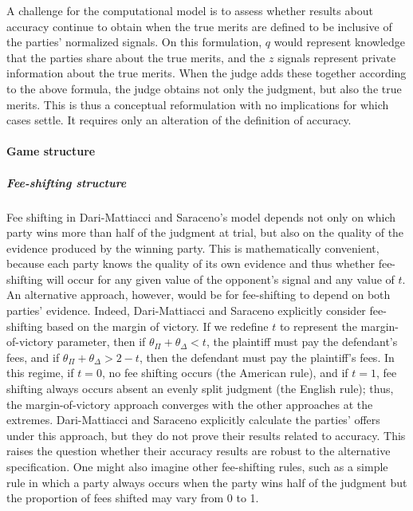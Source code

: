 \documentclass{article}
\begin{document}
A challenge for the computational model is to assess whether results about accuracy continue to obtain when the true merits are defined to be inclusive of the parties' normalized signals. On this formulation, $q$ would represent knowledge that the parties share about the true merits, and the $z$ signals represent private information about the true merits. When the judge adds these together according to the above formula, the judge obtains not only the judgment, but also the true merits. This is thus a conceptual reformulation with no implications for which cases settle. It requires only an alteration of the definition of accuracy.

\paragraph{Game structure}

\subparagraph{Fee-shifting structure}Fee shifting in Dari-Mattiacci and Saraceno's model depends not only on which party wins more than half of the judgment at trial, but also on the quality of the evidence produced by the winning party. This is mathematically convenient, because each party knows the quality of its own evidence and thus whether fee-shifting will occur for any given value of the opponent's signal and any value of $t$. An alternative approach, however, would be for fee-shifting to depend on both parties' evidence. Indeed, Dari-Mattiacci and Saraceno explicitly consider fee-shifting based on the margin of victory. If we redefine $t$ to represent the margin-of-victory parameter, then if $\theta_\Pi + \theta_\Delta < t$, the plaintiff must pay the defendant's fees, and if $\theta_\Pi + \theta_\Delta > 2 - t$, then the defendant must pay the plaintiff's fees. In this regime, if $t = 0$, no fee shifting occurs (the American rule), and if $t = 1$, fee shifting always occurs absent an evenly split judgment (the English rule); thus, the margin-of-victory approach converges with the other approaches at the extremes. Dari-Mattiacci and Saraceno explicitly calculate the parties' offers under this approach, but they do not prove their results related to accuracy. This raises the question whether their accuracy results are robust to the alternative specification. One might also imagine other fee-shifting rules, such as a simple rule in which a party always occurs when the party wins half of the judgment but the proportion of fees shifted may vary from 0 to 1.
\end{document}
